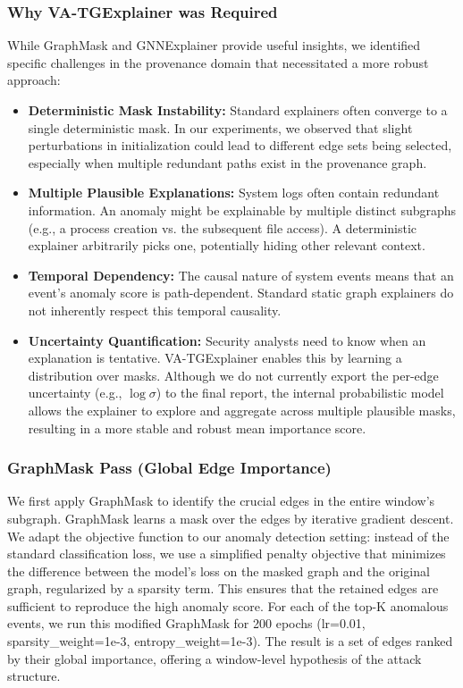 \documentclass[conference]{IEEEtran}
\begin{document}
\subsubsection{Why VA-TGExplainer was Required}
While GraphMask and GNNExplainer provide useful insights, we identified specific challenges in the provenance domain that necessitated a more robust approach:
\begin{itemize}
    \item \textbf{Deterministic Mask Instability:} Standard explainers often converge to a single deterministic mask. In our experiments, we observed that slight perturbations in initialization could lead to different edge sets being selected, especially when multiple redundant paths exist in the provenance graph.
    \item \textbf{Multiple Plausible Explanations:} System logs often contain redundant information. An anomaly might be explainable by multiple distinct subgraphs (e.g., a process creation vs. the subsequent file access). A deterministic explainer arbitrarily picks one, potentially hiding other relevant context.
    \item \textbf{Temporal Dependency:} The causal nature of system events means that an event's anomaly score is path-dependent. Standard static graph explainers do not inherently respect this temporal causality.
    \item \textbf{Uncertainty Quantification:} Security analysts need to know when an explanation is tentative. VA-TGExplainer enables this by learning a distribution over masks. Although we do not currently export the per-edge uncertainty (e.g., $\log \sigma$) to the final report, the internal probabilistic model allows the explainer to explore and aggregate across multiple plausible masks, resulting in a more stable and robust mean importance score.
\end{itemize}

\subsubsection{GraphMask Pass (Global Edge Importance)}
We first apply GraphMask to identify the crucial edges in the entire window's subgraph. GraphMask learns a mask over the edges by iterative gradient descent. We adapt the objective function to our anomaly detection setting: instead of the standard classification loss, we use a simplified penalty objective that minimizes the difference between the model's loss on the masked graph and the original graph, regularized by a sparsity term. This ensures that the retained edges are sufficient to reproduce the high anomaly score. For each of the top-K anomalous events, we run this modified GraphMask for 200 epochs (lr=0.01, sparsity\_weight=1e-3, entropy\_weight=1e-3). The result is a set of edges ranked by their global importance, offering a window-level hypothesis of the attack structure.
\end{document}
